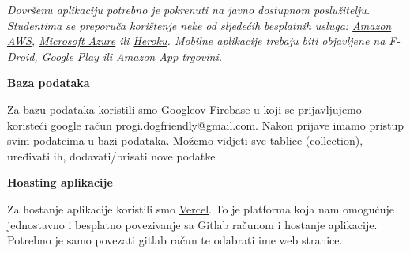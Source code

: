 			
			 \textit{Dovršenu aplikaciju potrebno je pokrenuti na javno dostupnom poslužitelju. Studentima se preporuča korištenje neke od sljedećih besplatnih usluga: \href{https://aws.amazon.com/}{Amazon AWS}, \href{https://azure.microsoft.com/en-us/}{Microsoft Azure} ili \href{https://www.heroku.com/}{Heroku}. Mobilne aplikacije trebaju biti objavljene na F-Droid, Google Play ili Amazon App trgovini.}

   \textbf{Baza podataka}

    Za bazu podataka koristili smo Googleov \href{https://firebase.google.com/}{Firebase} u koji se prijavljujemo koristeći google račun progi.dogfriendly@gmail.com. Nakon prijave imamo pristup svim podatcima u bazi podataka. Možemo vidjeti sve tablice (collection), uređivati ih, dodavati/brisati nove podatke

    \textbf{Hoasting aplikacije}
    
    Za hostanje aplikacije koristili smo \href{https://vercel.com/}{Vercel}. To je platforma koja nam omogućuje jednostavno i besplatno povezivanje sa Gitlab računom i hostanje aplikacije. Potrebno je samo povezati gitlab račun te odabrati ime web stranice. 
			
			
			\eject 